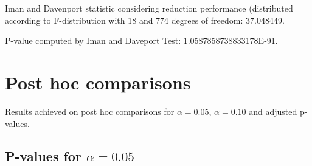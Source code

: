 \documentclass[a4paper,10pt]{article}
\begin{document}
\begin{landscape}
Iman and Davenport statistic considering reduction performance (distributed according to F-distribution with 18 and 774 degrees of freedom: 37.048449.

P-value computed by Iman and Daveport Test: 1.0587858738833178E-91.\newline



\pagebreak

\section{Post hoc comparisons}

Results achieved on post hoc comparisons for $\alpha = 0.05$, $\alpha = 0.10$ and adjusted p-values.

\subsection{P-values for $\alpha=0.05$}


\end{landscape}
\end{document}
